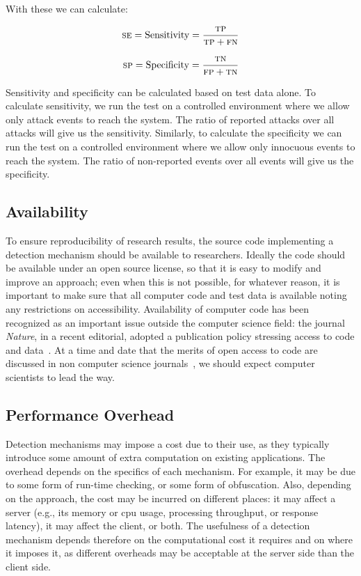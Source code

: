 \documentclass[conference]{IEEEtran}
\begin{document}
\noindent
With these we can calculate:

\begin{equation}
  \textsc{se} = \textrm{Sensitivity} = \frac{\textsc{tp}}{\textsc{tp}
    + \textsc{fn}}
\label{eq:sensitivity}
\end{equation}

\begin{equation}
  \textsc{sp} = \textrm{Specificity} = \frac{\textsc{tn}}{\textsc{fp}
    + \textsc{tn}}
\label{eq:specificity}
\end{equation}

\noindent
Sensitivity and specificity can be calculated based on test
data alone. To calculate sensitivity, we run the test on a
controlled environment where we allow only attack events to reach the
system. The ratio of reported attacks over all attacks will give us
the sensitivity. Similarly, to calculate the specificity we can run
the test on a controlled environment where we allow only innocuous
events to reach the system. The ratio of non-reported events over all
events will give us the specificity. 

\subsection{Availability}

To ensure reproducibility of research results, the source code
implementing a detection mechanism should be available to researchers.
Ideally the code should be available under an open source license, so
that it is easy to modify and improve an approach; even when this is
not possible, for whatever reason, it is important to make sure that
all computer code and test data is available noting any restrictions
on accessibility. Availability of computer code has been recognized as
an important issue outside the computer science field: the journal
\emph{Nature}, in a recent editorial, adopted a publication policy stressing
access to code and data~\cite{nature2014}. At a time and date that the
merits of open access to code are discussed in non computer science
journals~\cite{easterbrook2014}, we should expect computer scientists
to lead the way.
 
\subsection{Performance Overhead}

Detection mechanisms may impose a cost due to their use, as they
typically introduce some amount of extra computation on existing applications.
The overhead depends on the specifics of each mechanism. For
example, it may be due to some form of run-time checking, or some form of
obfuscation. Also, depending on the approach, the cost may be incurred
on different places: it may affect a server
(e.g., its memory or {\sc cpu} usage, processing throughput, or response latency),
it may affect the client, or both. The
usefulness of a detection mechanism depends therefore on the
computational cost it requires and on where it imposes it, as
different overheads may be acceptable at the server side than the client side.
\end{document}
